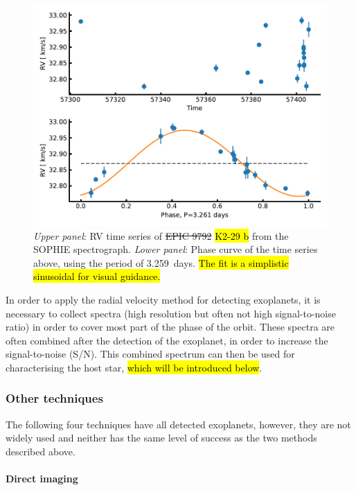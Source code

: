 \begin{figure}[htpb!]
    \centering
    \includegraphics[width=1.0\linewidth]{figures/RVmethod.pdf}
    \caption{\emph{Upper panel}: RV time series of \st{EPIC 9792} \hl{K2-29 b} from the SOPHIE spectrograph.
             \emph{Lower panel}: Phase curve of the time series above, using the period of
             \SI{3.259}{days}. \hl{The fit is a simplistic sinusoidal for visual guidance.}}
    \label{fig:rvmethod}
\end{figure}

In order to apply the radial velocity method for detecting exoplanets, it is necessary to collect
spectra (high resolution but often not high signal-to-noise ratio) in order to cover most part of
the phase of the orbit. These spectra are often combined after the detection of the exoplanet, in
order to increase the signal-to-noise (S/N). This combined spectrum can then be used for
characterising the host star, \hl{which will be introduced below}.


\subsubsection{Other techniques}

The following four techniques have all detected exoplanets, however, they are not widely used and
neither has the same level of success as the two methods described above.

\paragraph{Direct imaging}

